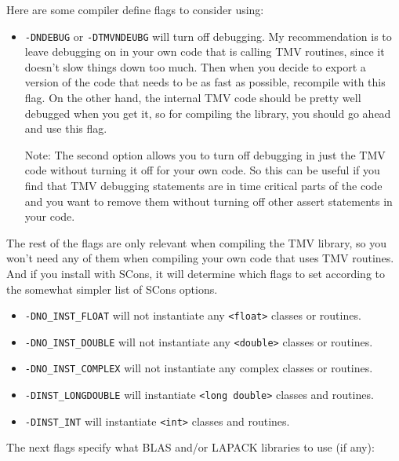 \documentclass[twoside,letterpaper,11pt]{article}
\renewcommand{\tt}[1]{{\lstinline {#1}}}
\begin{document}
Here are some compiler define flags to consider using:
\begin{itemize}
\item
\texttt{-DNDEBUG} or \texttt{-DTMVNDEUBG}
will turn off debugging.  My recommendation is to leave debugging
on in your own code that is calling TMV routines, since it doesn't slow things down too 
much.  Then when you decide to export a version of the code that needs to be as fast 
as possible, recompile with this flag.
On the other hand, the internal TMV code should be pretty well debugged
when you get it, so for compiling the library, you should go ahead and use this flag.

Note: The second option allows you to turn off debugging in just the TMV code
without turning it off for your own code.  So this can be useful if you 
find that TMV debugging statements are in time critical parts of the code
and you want to remove them without turning off other assert statements 
in your code.
\end{itemize}
The rest of the flags are only relevant when compiling the TMV library, so you won't 
need any of them when compiling your own code that uses TMV routines.  And if you 
install with SCons, it will determine which flags to set according to the somewhat simpler 
list of SCons options.
\begin{itemize}
\item
\texttt{-DNO\_INST\_FLOAT} will not instantiate any \tt{<float>} classes or routines.
\item
\texttt{-DNO\_INST\_DOUBLE} will not instantiate any \tt{<double>} classes or routines.
\item
\texttt{-DNO\_INST\_COMPLEX} will not instantiate any complex classes or routines.
\item
\texttt{-DINST\_LONGDOUBLE} will instantiate \tt{<long double>} classes and routines.
\item
\texttt{-DINST\_INT} will instantiate \tt{<int>} classes and routines.
\end{itemize}
The next flags specify what BLAS and/or LAPACK libraries to use (if any):
\end{document}
